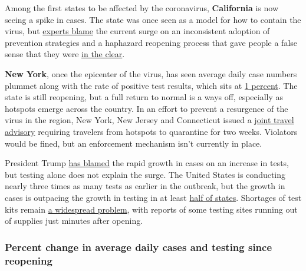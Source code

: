 Among the first states to be affected by the coronavirus,
\textbf{California} is now seeing a spike in cases. The state was once
seen as a model for how to contain the virus, but
\href{https://www.vox.com/future-perfect/2020/7/6/21308351/california-coronavirus-pandemic-covid-outbreak}{experts
blame} the current surge on an inconsistent adoption of prevention
strategies and a haphazard reopening process that gave people a false
sense that they were
\href{https://www.nytimes.com/2020/06/29/us/california-coronavirus-reopening.html}{in
the clear}.

\textbf{New York}, once the epicenter of the virus, has seen average
daily case numbers plummet along with the rate of positive test results,
which sits at
\href{https://covid19tracker.health.ny.gov/views/NYS-COVID19-Tracker/NYSDOHCOVID-19Tracker-DailyTracker?\%3Aembed=yes\&\%3Atoolbar=no\&\%3Atabs=n}{1
percent}. The state is still reopening, but a full return to normal is a
ways off, especially as hotspots emerge across the country. In an effort
to prevent a resurgence of the virus in the region, New York, New Jersey
and Connecticut issued a
\href{https://www.nytimes.com/2020/06/24/nyregion/ny-coronavirus-states-quarantine.html}{joint
travel advisory} requiring travelers from hotspots to quarantine for two
weeks. Violators would be fined, but an enforcement mechanism isn't
currently in place.

President Trump
\href{https://www.nytimes.com/video/us/politics/100000007202247/trump-tulsa-rally.html}{has
blamed} the rapid growth in cases on an increase in tests, but testing
alone does not explain the surge. The United States is conducting nearly
three times as many tests as earlier in the outbreak, but the growth in
cases is outpacing the growth in testing in at least
\href{https://www.axios.com/coronavirus-cases-testing-growth-62d6256b-33e2-491d-b94e-91110a74bc85.html}{half
of states}. Shortages of test kits remain
\href{https://www.nytimes.com/2020/07/06/us/coronavirus-test-shortage.html}{a
widespread problem}, with reports of some testing sites running out of
supplies just minutes after opening.

\hypertarget{percent-change-in-average-daily-cases-and-testing-since-reopening}{%
\subsubsection{Percent change in average daily cases and testing since
reopening}\label{percent-change-in-average-daily-cases-and-testing-since-reopening}}

